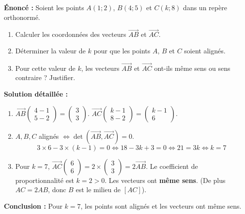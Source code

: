 \documentclass[11pt]{article}
\begin{document}
\begin{exoresolu}
    \textbf{Énoncé :} Soient les points $A(1;2)$, $B(4;5)$ et $C(k;8)$ dans un repère orthonormé.
    \begin{enumerate}
        \item Calculer les coordonnées des vecteurs $\overrightarrow{AB}$ et $\overrightarrow{AC}$.
        \item Déterminer la valeur de $k$ pour que les points $A$, $B$ et $C$ soient alignés.
        \item Pour cette valeur de $k$, les vecteurs $\overrightarrow{AB}$ et $\overrightarrow{AC}$ ont-ils même sens ou sens contraire ? Justifier.
    \end{enumerate}
    \tcblower
    \textbf{Solution détaillée :}
    \begin{enumerate}
        \item $\overrightarrow{AB}\begin{pmatrix} 4-1 \\ 5-2 \end{pmatrix} = \begin{pmatrix} 3 \\ 3 \end{pmatrix}$.
        $\overrightarrow{AC}\begin{pmatrix} k-1 \\ 8-2 \end{pmatrix} = \begin{pmatrix} k-1 \\ 6 \end{pmatrix}$.
        \item $A,B,C$ alignés $\iff \det(\overrightarrow{AB},\overrightarrow{AC})=0$.
        \[
        3 \times 6 - 3 \times (k-1) = 0 \iff 18 - 3k + 3 = 0 \iff 21 = 3k \iff k = 7
        \]
        \item Pour $k=7$, $\overrightarrow{AC}\begin{pmatrix} 6 \\ 6 \end{pmatrix} = 2 \times \begin{pmatrix} 3 \\ 3 \end{pmatrix} = 2\overrightarrow{AB}$.
        Le coefficient de proportionnalité est $k=2 > 0$. Les vecteurs ont \textbf{même sens}.
        (De plus $AC = 2 AB$, donc $B$ est le milieu de $[AC]$).
    \end{enumerate}
    \textbf{Conclusion :} Pour $k=7$, les points sont alignés et les vecteurs ont même sens.
\end{exoresolu}
\end{document}
